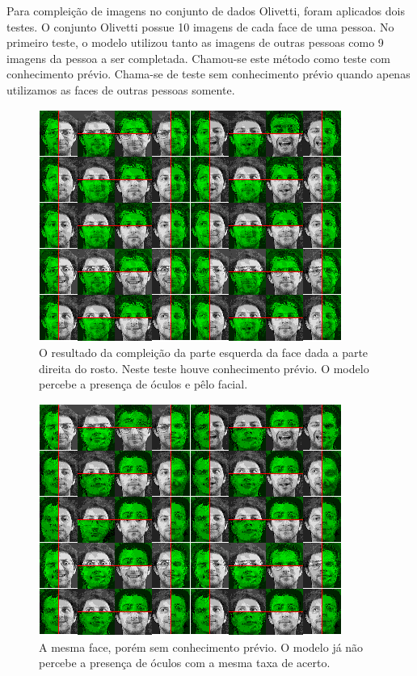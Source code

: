 \documentclass[12pt]{article}
\theoremstyle{plain}
\numberwithin{equation}{section}
\begin{document}
Para compleição de imagens no conjunto de dados Olivetti, foram aplicados dois testes. O conjunto
Olivetti possue 10 imagens de cada face de uma pessoa. No primeiro teste, o modelo utilizou tanto
as imagens de outras pessoas como 9 imagens da pessoa a ser completada. Chamou-se este método como
teste com conhecimento prévio. Chama-se de teste sem conhecimento prévio quando apenas utilizamos
as faces de outras pessoas somente.

\begin{figure}[h]
  \centering\includegraphics[scale=0.9]{imgs/c1_face_cmpl_39.png}
  \captionsetup{justification=raggedright}
  \caption{O resultado da compleição da parte esquerda da face dada a parte direita do rosto. Neste
  teste houve conhecimento prévio. O modelo percebe a presença de óculos e pêlo facial.}
\end{figure}
\newpage

\begin{figure}[H]
  \centering\includegraphics[scale=0.9]{imgs/c2_face_cmpl_39.png}
  \captionsetup{justification=raggedright}
  \caption{A mesma face, porém sem conhecimento prévio. O modelo já não percebe a presença de
  óculos com a mesma taxa de acerto.}
\end{figure}

\printbibliography[]
\end{document}

